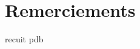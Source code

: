 %

\begingroup

\let\clearpage\relax
\let\cleardoublepage\relax
\let\cleardoublepage\relax

\chapter*{Remerciements}
\label{sec:remerciements}



\noindent \Blindtext[1][1]
\gls{recuit} \acrshort{pdb}

\endgroup